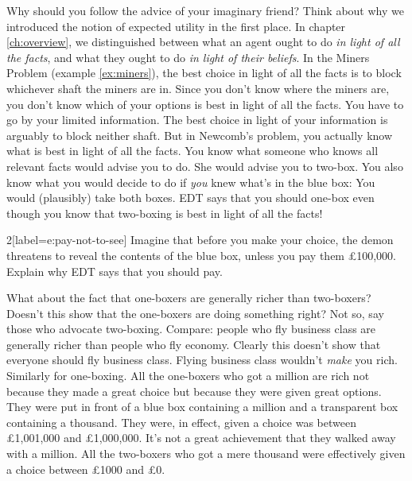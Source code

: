 Why should you follow the advice of your imaginary friend? Think about why we
introduced the notion of expected utility in the first place. In chapter
\ref{ch:overview}, we distinguished between what an agent ought to do \emph{in
  light of all the facts}, and what they ought to do \emph{in light of their
  beliefs}. In the Miners Problem (example \ref{ex:miners}), the best choice in
light of all the facts is to block whichever shaft the miners are in. Since you
don't know where the miners are, you don't know which of your options is best in
light of all the facts. You have to go by your limited information. The best
choice in light of your information is arguably to block neither shaft. But in
Newcomb's problem, you actually know what is best in light of all the facts. You
know what someone who knows all relevant facts would advise you to do. She would
advise you to two-box. You also know what you would decide to do if \emph{you}
knew what's in the blue box: You would (plausibly) take both boxes. EDT says
that you should one-box even though you know that two-boxing is best in light of
all the facts!

\begin{exercise}{2}[label=e:pay-not-to-see]
  Imagine that before you make your choice, the demon threatens to reveal the
  contents of the blue box, unless you pay them £100,000. Explain why EDT says
  that you should pay.
\end{exercise}

What about the fact that one-boxers are generally richer than two-boxers?
Doesn't this show that the one-boxers are doing something right? Not so, say
those who advocate two-boxing. Compare: people who fly business class are
generally richer than people who fly economy. Clearly this doesn't show that
everyone should fly business class. Flying business class wouldn't \emph{make}
you rich. Similarly for one-boxing. All the one-boxers who got a million are
rich not because they made a great choice but because they were given great
options. They were put in front of a blue box containing a million and a
transparent box containing a thousand. They were, in effect, given a choice was
between £1,001,000 and £1,000,000. It's not a great achievement that they walked
away with a million. All the two-boxers who got a mere thousand were effectively
given a choice between £1000 and £0.


